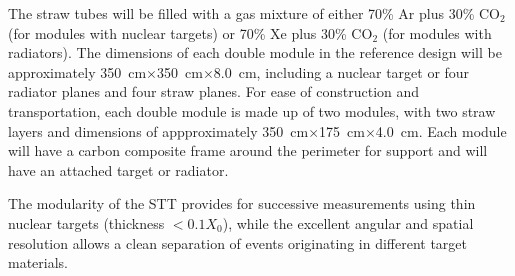 The straw tubes will be filled with a gas mixture of either 70\% Ar
plus 30\% CO$_2$ (for modules with nuclear targets) or 70\% Xe plus 30\%
CO$_2$ (for modules with radiators).  The dimensions of each double module in
the reference design will be approximately
350~cm$\times$350~cm$\times$8.0~cm, including a nuclear target or four radiator
planes and four straw planes. For ease of construction and
transportation, each double module is made up of two modules, with
two straw layers and dimensions of appproximately 350~cm$\times$175~cm$\times$4.0~cm.  Each
module will have a carbon composite frame around the perimeter for
support and will have an attached target or radiator.


The modularity of the STT provides for successive measurements using
thin nuclear targets (thickness $< 0.1 X_0$), while the excellent
angular and spatial resolution allows a clean separation of events
originating in different target materials.

